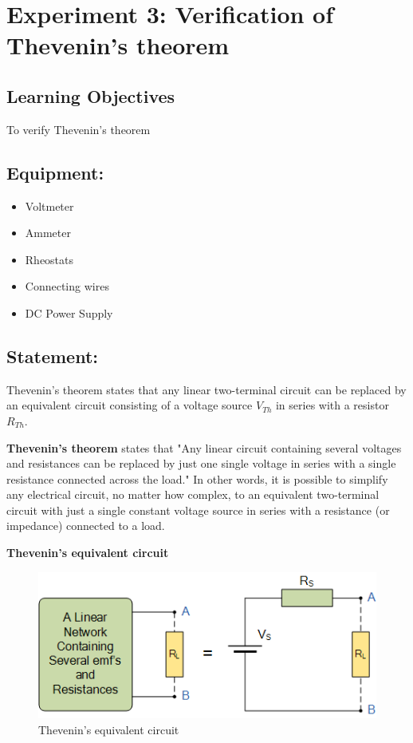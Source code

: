 \section*{Experiment 3: Verification of Thevenin’s theorem}  

\subsection*{Learning Objectives}
To verify Thevenin's theorem

\subsection*{Equipment:}

\begin{itemize}
    \item Voltmeter
    \item Ammeter
    \item Rheostats
    \item Connecting wires
    \item DC Power Supply
\end{itemize}

\subsection*{Statement:}
Thevenin’s theorem states that any linear two-terminal circuit can be replaced by an equivalent circuit consisting of a voltage source $V_{Th}$ in series with a resistor $R_{Th}$.

\vspace{0.25 cm}

\noindent \textbf{Thevenin's theorem} states that "Any linear circuit containing several voltages and resistances can be replaced by just one single voltage in series with a single resistance connected across the load." In other words, it is possible to simplify any electrical circuit, no matter how complex, to an equivalent two-terminal circuit with just a single constant voltage source in series with a resistance (or impedance) connected to a load. 

\vspace{0.25 cm}

\noindent \textbf{Thevenin’s equivalent circuit}

\begin{figure}[H]
    \centering
    \includegraphics[width=0.7\linewidth]{img/thevenin.png}
    \caption{Thevenin's equivalent circuit}
    \label{fig:thevenin-circuit}
\end{figure}

